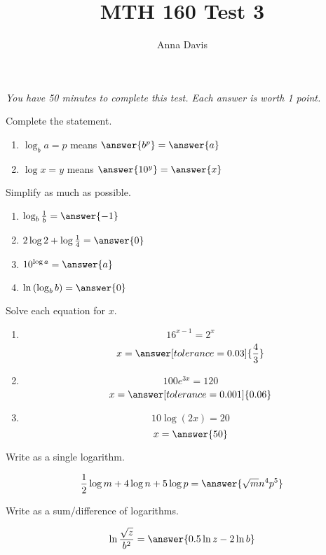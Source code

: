 \documentclass{ximera}
\author{Anna Davis} \title{MTH 160 Test 3}
\begin{document}
\begin{abstract}

\end{abstract}
\maketitle
 \textit{You have 50 minutes to complete this test.  Each answer is worth 1 point.}
 \begin{problem}\label{prob:160test3prob1}
 Complete the statement.
 \begin{enumerate}
     \item 
 $\log_b a=p$ means $\answer{b^p}=\answer{a}$
 \item
 $\log x=y$ means $\answer{10^y}=\answer{x}$
 \end{enumerate}
 \end{problem}
 
 \begin{problem}\label{prob:160test3prob2}
 Simplify as much as possible.
 \begin{enumerate}
     \item $\log_b \frac{1}{b}=\answer{-1}$
     \item $2\log 2+\log\frac{1}{4}=\answer{0}$
     \item $10^{\log a}=\answer{a}$
     \item $\ln\left(\log_b b\right)=\answer{0}$
 \end{enumerate}
 \end{problem}
 
 \begin{problem}\label{prob:160test3prob3}
 Solve each equation for $x$.
 \begin{enumerate}
     \item $$16^{x-1}=2^x$$
     $$x=\answer[tolerance=0.03]{\frac{4}{3}}$$
     \item 
     $$100e^{3x}=120$$
     $$x=\answer[tolerance=0.001]{0.06}$$
     \item 
     $$10\log (2x)=20$$
     $$x=\answer{50}$$
 \end{enumerate}
 \end{problem}
 
 \begin{problem}\label{prob:160test3prob4}
 Write as a single logarithm.
 
 $$\frac{1}{2}\log m+4\log n+5\log p=\answer{\sqrt{m}n^4p^5}$$
 \end{problem}
 
 \begin{problem}\label{prob:160test3prob5}
 Write as a sum/difference of logarithms.
 
 $$\ln \frac{\sqrt{z}}{b^2}=\answer{0.5\ln z-2\ln b}$$
 \end{problem}
 
\end{document}
